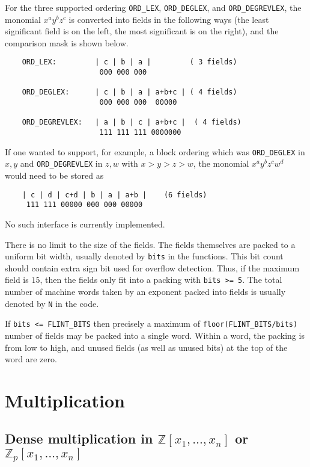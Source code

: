 \documentclass[12pt,reqno]{amsart}
\numberwithin{equation}{section}
\newcommand{\bbZ}[0]  { \mathbb{Z}}
\begin{document}
For the three supported ordering {\tt ORD\_LEX}, {\tt ORD\_DEGLEX}, and {\tt ORD\_DEGREVLEX}, the
monomial $x^a y^b z^c$ is converted into fields in the following ways (the
least significant field is on the left, the most significant is on the right),
and the comparison mask is shown below.

\begin{verbatim}
    ORD_LEX:         | c | b | a |         ( 3 fields)
                      000 000 000

    ORD_DEGLEX:      | c | b | a | a+b+c | ( 4 fields)
                      000 000 000  00000

    ORD_DEGREVLEX:   | a | b | c | a+b+c |  ( 4 fields)
                      111 111 111 0000000
\end{verbatim}

If one wanted to support, for example, a block ordering which was {\tt ORD\_DEGLEX}
in $x, y$ and {\tt ORD\_DEGREVLEX} in $z, w$ with $x>y>z>w$,
the monomial $x^a y^b z^c w^d$ would need to be stored as

\begin{verbatim}
    | c | d | c+d | b | a | a+b |    (6 fields)
     111 111 00000 000 000 00000
\end{verbatim}

No such interface is currently implemented.


There is no limit to the size of the fields. The fields themselves are packed
to a uniform bit width, usually denoted by {\tt bits} in the functions. This bit
count should contain extra sign bit used for overflow detection. Thus, if the
maximum field is $15$, then the fields only fit into a packing with {\tt bits >= 5}.
The total number of machine words taken by an exponent packed into fields
is usually denoted by {\tt N} in the code.

If {\tt bits <= FLINT\_BITS} then precisely a maximum of {\tt floor(FLINT\_BITS/bits)}
number of fields may be packed into a single word. Within a word, the packing
is from low to high, and unused fields (as well as unused bits) at the top of
the word are zero.

\section{Multiplication}
\subsection{Dense multiplication in $\bbZ[x_1,\dots,x_n]$ or $\bbZ_p[x_1,\dots,x_n]$}\
\end{document}
